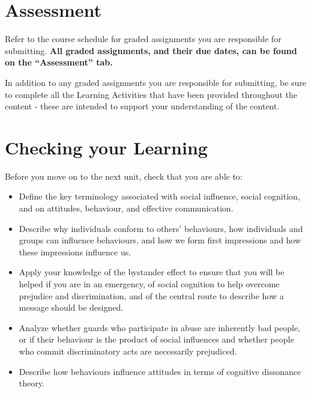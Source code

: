 \documentclass[
]{book}
\begin{document}
\hypertarget{assessment-5}{%
\section*{Assessment}\label{assessment-5}}

\begin{assessment}
Refer to the course schedule for graded assignments you are responsible for submitting. \textbf{All graded assignments, and their due dates, can be found on the ``Assessment'' tab.}

In addition to any graded assignments you are responsible for submitting, be sure to complete all the Learning Activities that have been provided throughout the content - these are intended to support your understanding of the content.
\end{assessment}

\hypertarget{checking-your-learning-5}{%
\section*{Checking your Learning}\label{checking-your-learning-5}}

\begin{progress}
Before you move on to the next unit, check that you are able to:

\begin{itemize}
\item
  Define the key terminology associated with social influence, social cognition, and on attitudes, behaviour, and effective communication.
\item
  Describe why individuals conform to others' behaviours, how individuals and groups can influence behaviours, and how we form first impressions and how these impressions influence us.
\item
  Apply your knowledge of the bystander effect to ensure that you will be helped if you are in an emergency, of social cognition to help overcome prejudice and discrimination, and of the central route to describe how a message should be designed.
\item
  Analyze whether guards who participate in abuse are inherently bad people, or if their behaviour is the product of social influences and whether people who commit discriminatory acts are necessarily prejudiced.
\item
  Describe how behaviours influence attitudes in terms of cognitive dissonance theory.
\end{itemize}
\end{progress}
\end{document}
